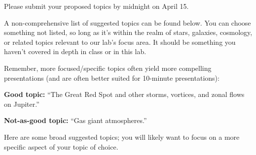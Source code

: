 \documentclass[11pt]{article}
\begin{document}
Please submit your proposed topics by midnight on April 15.

\medskip \noindent
A non-comprehensive list of suggested topics can be found below. You can choose something not listed, so long as it's within the realm of stars, galaxies, cosmology, or related topics relevant to our lab's focus area. It should be something you haven't covered in depth in class or in this lab.

\medskip \noindent
Remember, more focused/specific topics often yield more compelling presentations (and are often better suited for 10-minute presentations):

\medskip \noindent
\textbf{Good topic:} ``The Great Red Spot and other storms, vortices, and zonal flows on
Jupiter.''

\noindent
\textbf{Not-as-good topic:} ``Gas giant atmospheres.''

Here are some broad suggested topics; you will likely want to focus on a more specific aspect of your topic of choice.
\end{document}
